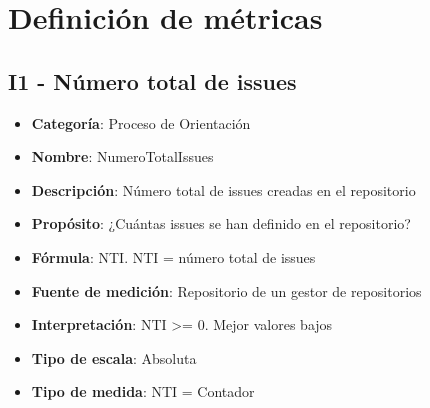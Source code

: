 

\section{Definición de métricas}
\subsection{I1 - Número total de issues}
\begin{itemize}
	\item \textbf{Categoría}: Proceso de Orientación
	\item \textbf{Nombre}: NumeroTotalIssues
	\item \textbf{Descripción}: Número total de issues creadas en el repositorio
	\item \textbf{Propósito}: ¿Cuántas issues se han definido en el repositorio?
	\item \textbf{Fórmula}: NTI. NTI = número total de issues
	\item \textbf{Fuente de medición}: Repositorio de un gestor de repositorios
	\item \textbf{Interpretación}: NTI >= 0. Mejor valores bajos
	\item \textbf{Tipo de escala}: Absoluta
	\item \textbf{Tipo de medida}: NTI = Contador
\end{itemize}
